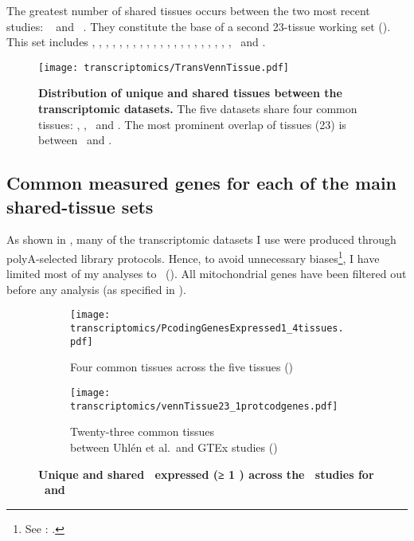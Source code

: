 The greatest number of shared tissues occurs
between the two most recent studies:
\uhlen~ and \gtex~.
They constitute the base of a second 23-tissue working set (\setTwo).
This set includes
\Adipose, \Adrenal, \Bladder, \Cortex, \hcolon, \Esophagus,
\Fallopian, \heart, \kidney, \liver, \lung, \Ovary, \Pancreas, \Prostate,
\salivary, \skeletal, \skin, \intestine, \spleen, \stomach, \testis,
\thyroid\ and \uterus.

\begin{figure}[!htbp]
\texttt{[image: transcriptomics/TransVennTissue.pdf]}\centering
\caption[Distribution of unique and shared tissues between the
transcriptomic datasets]
{\label{fig:VennStudiesT}\textbf{Distribution of unique and shared tissues
between the transcriptomic datasets.} The five datasets share four
common tissues: \heart, \kidney, \liver\ and \testis.
The most prominent overlap of tissues (23) is between \uhlen\ and \gtex.
}
\end{figure}
\vspace*{-5mm}

\subsection{Common measured genes for each of the main shared-tissue sets\quad}%
\label{subsec:transGeneOverlap}
\vspace*{-9mm}
As shown in ,
many of the transcriptomic datasets I use were produced through
polyA-selected library protocols.
Hence,
to avoid unnecessary biases\footnote{See
: .},
I have limited most of my analyses to \pcgs\ ().
All mitochondrial genes have been filtered out before any \treps{} analysis
(as specified in ).

\begin{figure}[!hptb]
    \centering
    \begin{subfigure}[b]{\textwidth}
        \centering \texttt{[image: transcriptomics/PcodingGenesExpressed1\_4tissues.pdf]}
        \caption{Four common tissues across the five tissues (\setOne)}\label{fig:ExpGenePcoding1}
    \end{subfigure}

    \begin{subfigure}[b]{\textwidth}
        \centering \texttt{[image: transcriptomics/vennTissue23\_1protcodgenes.pdf]}
        \caption{Twenty-three common tissues\\ between Uhlén et al.\
        and GTEx studies (\setTwo)}\label{fig:ExpGenePcoding1_t23}
    \end{subfigure}
    \caption[Unique and shared \pcgs\ expressed (≥1 \FPKM) across RNA-Seq studies]%
    {\textbf{Unique and shared \pcgs\ expressed (≥ 1 \FPKM) across the \Rnaseq\ studies
    for \setOne\ and \setTwo}}
\end{figure}

